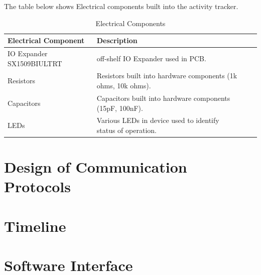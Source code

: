 \documentclass[12pt, titlepage]{article}
\begin{document}
The table below shows Electrical components built into the activity tracker.

\begin{table}[H]
	\begin{tabularx}{1.05\textwidth} { 
		  | >{\centering\arraybackslash}X 
		  | >{\centering\arraybackslash}X 
		  | >{\centering\arraybackslash}X 
		  | >{\centering\arraybackslash}X | }
		 \hline
		 \textbf{Electrical Component} & \textbf{Description}\\
		 \hline
		IO Expander SX1509BIULTRT & off-shelf IO Expander used in PCB.  \\
		\hline 
		 Resistors  & Resistors built into hardware components (1k ohms, 10k ohms).\\
		\hline
		 Capacitors  & Capacitors built into hardware components (15pF, 100nF).\\
		 \hline
		 LEDs  & Various LEDs in device used to identify status of operation.\\
		 \hline
	\end{tabularx}
\caption{\label{DesignElectrical}Electrical Components}  
\end{table}



\section{Design of Communication Protocols}


\section{Timeline}


% 

\newpage{}

\appendix

\section{Software Interface}
\end{document}
